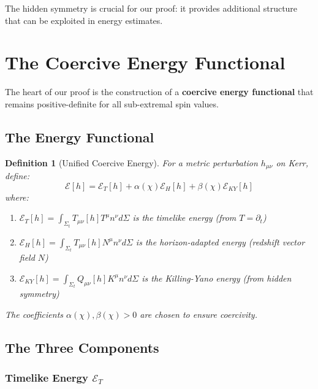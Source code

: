 \documentclass[12pt,a4paper]{article}
\newtheorem{definition}[theorem]{Definition}
\begin{document}
The hidden symmetry is crucial for our proof: it provides additional structure that can be exploited in energy estimates.

\section{The Coercive Energy Functional}

The heart of our proof is the construction of a \textbf{coercive energy functional} that remains positive-definite for all sub-extremal spin values.

\subsection{The Energy Functional}

\begin{definition}[Unified Coercive Energy]\label{def:energy}
For a metric perturbation $h_{\mu\nu}$ on Kerr, define:
\begin{equation}
\mathcal{E}[h] = \mathcal{E}_T[h] + \alpha(\chi)\mathcal{E}_H[h] + \beta(\chi)\mathcal{E}_{KY}[h]
\end{equation}
where:
\begin{enumerate}
    \item $\mathcal{E}_T[h] = \int_{\Sigma_t} T_{\mu\nu}[h] T^\mu n^\nu d\Sigma$ is the timelike energy (from $T = \partial_t$)
    \item $\mathcal{E}_H[h] = \int_{\Sigma_t} T_{\mu\nu}[h] N^\mu n^\nu d\Sigma$ is the horizon-adapted energy (redshift vector field $N$)
    \item $\mathcal{E}_{KY}[h] = \int_{\Sigma_t} Q_{\mu\nu}[h] K^\mu n^\nu d\Sigma$ is the Killing-Yano energy (from hidden symmetry)
\end{enumerate}
The coefficients $\alpha(\chi), \beta(\chi) > 0$ are chosen to ensure coercivity.
\end{definition}

\subsection{The Three Components}

\subsubsection{Timelike Energy $\mathcal{E}_T$}
\end{document}
